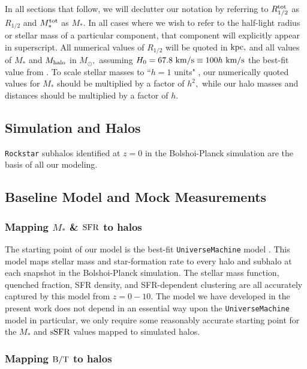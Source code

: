 \documentclass[usenatbib,usegraphicx,letterpaper]{mn2e}
\newcommand{\rhalf}{R_{1/2}}
\newcommand{\rhalftot}{R^{\rm tot}_{1/2}}
\newcommand{\bt}{{\rm B/T}}
\newcommand{\mstar}{M_{\ast}}
\newcommand{\mstartot}{M^{\rm tot}_{\ast}}
\newcommand{\ssfr}{{\rm sSFR}}
\newcommand{\sfr}{{\rm SFR}}
\newcommand{\mhalo}{M_{\rm halo}}
\newcommand{\kpc}{{\rm kpc}}
\newcommand{\msun}{M_\odot}
\newcommand{\kms}{{\rm km/s}}
\begin{document}
In all sections that follow, we will declutter our notation by referring to $\rhalftot$ as $\rhalf$ and $\mstartot$ as $\mstar.$ In all cases where we wish to refer to the half-light radius or stellar mass of a particular component, that component will explicitly appear in superscript. All numerical values of $\rhalf$ will be quoted in $\kpc,$ and all values of $\mstar$ and $\mhalo$ in $\msun,$ assuming $H_0=67.8~\kms\equiv100h~\kms$ the best-fit value from \citet{planck15}. To scale stellar masses to ``$h=1$ units" \citep{croton13}, our numerically quoted values for $\mstar$ should be multiplied by a factor of $h^2,$ while our halo masses and distances should be multiplied by a factor of $h.$

\subsection{Simulation and Halos}
\label{subsec:sim}

{\tt Rockstar} subhalos identified at $z=0$ in the Bolshoi-Planck simulation are the basis of all our modeling.

\subsection{Baseline Model and Mock Measurements}
\label{subsec:baselinemock}

\subsubsection{Mapping $\mstar$ \& $\sfr$ to halos}
\label{subsubsec:umachine}

The starting point of our model is the best-fit {\tt UniverseMachine} model \citep[][in prep]{behroozi_etal17}. This model maps stellar mass and star-formation rate to every halo and subhalo at each snapshot in the Bolshoi-Planck simulation. The stellar mass function, quenched fraction, SFR density, and SFR-dependent clustering are all accurately captured by this model from $z=0-10.$ The model we have developed in the present work does not depend in an essential way upon the {\tt UniverseMachine} model in particular, we only require some reasonably accurate starting point for the $\mstar$ and $\ssfr$ values mapped to simulated halos.

\subsubsection{Mapping $\bt$ to halos}
\label{subsubsec:random_bt_model}
\end{document}
